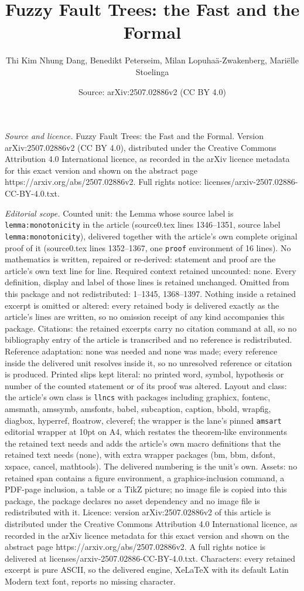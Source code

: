 \documentclass[10pt,a4paper]{amsart}
\title[Fuzzy Fault Trees: the Fast and the Formal]{Fuzzy Fault Trees: the Fast and the Formal}
\author{Thi Kim Nhung Dang, Benedikt Peterseim, Milan Lopuha\"a-Zwakenberg, Mari\"elle Stoelinga}
\date{Source: arXiv:2507.02886v2 (CC BY 4.0)}
\begin{document}
\maketitle

\noindent\emph{Source and licence.} Fuzzy Fault Trees: the Fast and the Formal. Version arXiv:2507.02886v2 (CC BY 4.0), distributed under the Creative Commons Attribution 4.0 International licence, as recorded in the arXiv licence metadata for this exact version and shown on the abstract page https://arxiv.org/abs/2507.02886v2. Full rights notice: licenses/arxiv-2507.02886-CC-BY-4.0.txt.\par\smallskip

\noindent\textit{Editorial scope.} Counted unit: the Lemma whose source label is \texttt{lemma:monotonicity} in the article (source0.tex lines 1346--1351, source label \texttt{lemma:monotonicity}), delivered together with the article's own complete original proof of it (source0.tex lines 1352--1367, one \texttt{proof} environment of 16 lines). No mathematics is written, repaired or re-derived: statement and proof are the article's own text line for line. Required context retained uncounted: none. Every definition, display and label of those lines is retained unchanged. Omitted from this package and not redistributed: 1--1345, 1368--1397. Nothing inside a retained excerpt is omitted or altered: every retained body is delivered exactly as the article's lines are written, so no omission receipt of any kind accompanies this package. Citations: the retained excerpts carry no citation command at all, so no bibliography entry of the article is transcribed and no reference is redistributed. Reference adaptation: none was needed and none was made; every reference inside the delivered unit resolves inside it, so no unresolved reference or citation is produced. Printed slips kept literal: no printed word, symbol, hypothesis or number of the counted statement or of its proof was altered. Layout and class: the article's own class is \texttt{llncs} with packages including graphicx, fontenc, amsmath, amssymb, amsfonts, babel, subcaption, caption, bbold, wrapfig, diagbox, hyperref, floatrow, cleveref; the wrapper is the lane's pinned \texttt{amsart} editorial wrapper at 10pt on A4, which restates the theorem-like environments the retained text needs and adds the article's own macro definitions that the retained text needs (none), with extra wrapper packages (bm, bbm, dsfont, xspace, cancel, mathtools). The delivered numbering is the unit's own. Assets: no retained span contains a figure environment, a graphics-inclusion command, a PDF-page inclusion, a table or a TikZ picture; no image file is copied into this package, the package declares no asset dependency and no image file is redistributed with it. Licence: version arXiv:2507.02886v2 of this article is distributed under the Creative Commons Attribution 4.0 International licence, as recorded in the arXiv licence metadata for this exact version and shown on the abstract page https://arxiv.org/abs/2507.02886v2. A full rights notice is delivered at licenses/arxiv-2507.02886-CC-BY-4.0.txt. Characters: every retained excerpt is pure ASCII, so the delivered engine, XeLaTeX with its default Latin Modern text font, reports no missing character.
\end{document}
